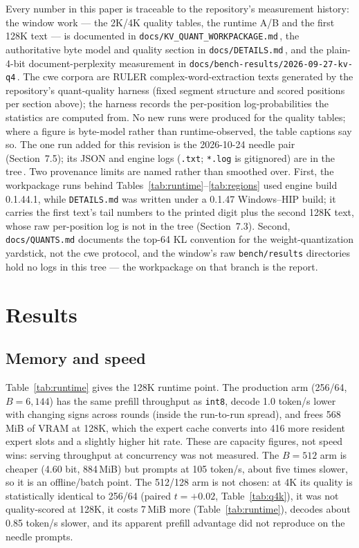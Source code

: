 \documentclass[10pt,twocolumn]{article}
\begin{document}
Every number in this paper is traceable to the repository's measurement history: the window work --- the 2K/4K quality tables, the runtime A/B and the first 128K text --- is documented in \texttt{docs/KV\_QUANT\_WORKPACKAGE.md}\,\cite{strata-wp}, the authoritative byte model and quality section in \texttt{docs/DETAILS.md}\,\cite{strata-details}, and the plain-4-bit document-perplexity measurement in \texttt{docs/bench-results/2026-09-27-kv-q4}\,\cite{strata-kv4}. The cwe corpora are RULER complex-word-extraction texts generated by the repository's quant-quality harness (fixed segment structure and scored positions per section above); the harness records the per-position log-probabilities the statistics are computed from. No new runs were produced for the quality tables; where a figure is byte-model rather than runtime-observed, the table captions say so. The one run added for this revision is the 2026-10-24 needle pair (Section~7.5); its JSON and engine logs (\texttt{.txt}; \texttt{*.log} is gitignored) are in the tree\,\cite{strata-needle24}. Two provenance limits are named rather than smoothed over. First, the workpackage runs behind Tables~\ref{tab:runtime}--\ref{tab:regions} used engine build 0.1.44.1, while \texttt{DETAILS.md} was written under a 0.1.47 Windows--HIP build; it carries the first text's tail numbers to the printed digit plus the second 128K text, whose raw per-position log is not in the tree (Section~7.3). Second, \texttt{docs/QUANTS.md} documents the top-64 KL convention for the weight-quantization yardstick, not the cwe protocol, and the window's raw \texttt{bench/results} directories hold no logs in this tree --- the workpackage on that branch is the report.

\section{Results}

\subsection{Memory and speed}

Table~\ref{tab:runtime} gives the 128K runtime point. The production arm (256/64, $B{=}6{,}144$) has the same prefill throughput as \texttt{int8}, decode 1.0 token/s lower with changing signs across rounds (inside the run-to-run spread), and frees 568\,MiB of VRAM at 128K, which the expert cache converts into 416 more resident expert slots and a slightly higher hit rate. These are capacity figures, not speed wins: serving throughput at concurrency was not measured. The $B{=}512$ arm is cheaper (4.60 bit, 884\,MiB) but prompts at 105 token/s, about five times slower, so it is an offline/batch point. The 512/128 arm is not chosen: at 4K its quality is statistically identical to 256/64 (paired $t{=}{+}0.02$, Table~\ref{tab:q4k}), it was not quality-scored at 128K, it costs 7\,MiB more (Table~\ref{tab:runtime}), decodes about 0.85 token/s slower, and its apparent prefill advantage did not reproduce on the needle prompts.
\end{document}
